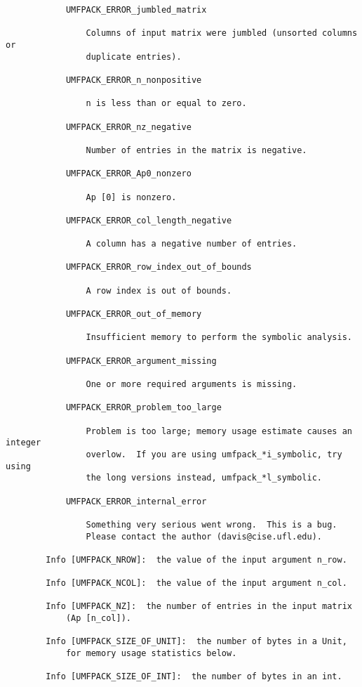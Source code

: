 {\begin{verbatim}
            UMFPACK_ERROR_jumbled_matrix

                Columns of input matrix were jumbled (unsorted columns or
                duplicate entries).

            UMFPACK_ERROR_n_nonpositive

                n is less than or equal to zero.

            UMFPACK_ERROR_nz_negative

                Number of entries in the matrix is negative.

            UMFPACK_ERROR_Ap0_nonzero

                Ap [0] is nonzero.

            UMFPACK_ERROR_col_length_negative

                A column has a negative number of entries.

            UMFPACK_ERROR_row_index_out_of_bounds

                A row index is out of bounds.

            UMFPACK_ERROR_out_of_memory

                Insufficient memory to perform the symbolic analysis.

            UMFPACK_ERROR_argument_missing

                One or more required arguments is missing.

            UMFPACK_ERROR_problem_too_large

                Problem is too large; memory usage estimate causes an integer
                overlow.  If you are using umfpack_*i_symbolic, try using
                the long versions instead, umfpack_*l_symbolic.

            UMFPACK_ERROR_internal_error

                Something very serious went wrong.  This is a bug.
                Please contact the author (davis@cise.ufl.edu).

        Info [UMFPACK_NROW]:  the value of the input argument n_row.

        Info [UMFPACK_NCOL]:  the value of the input argument n_col.

        Info [UMFPACK_NZ]:  the number of entries in the input matrix
            (Ap [n_col]).

        Info [UMFPACK_SIZE_OF_UNIT]:  the number of bytes in a Unit,
            for memory usage statistics below.

        Info [UMFPACK_SIZE_OF_INT]:  the number of bytes in an int.


\end{verbatim}}
